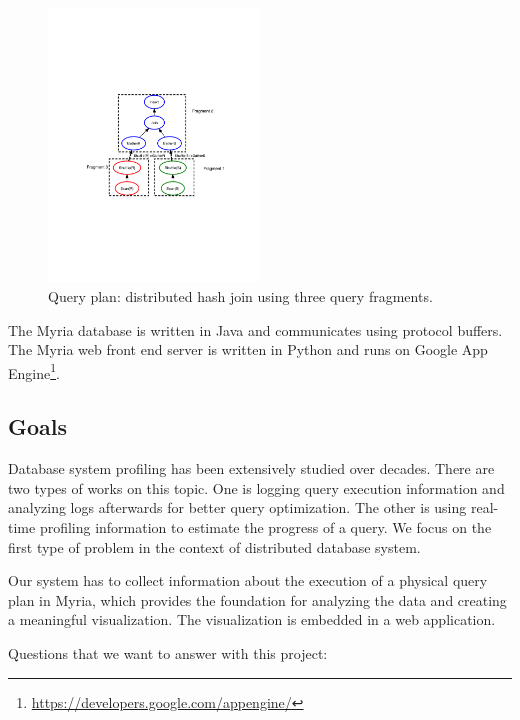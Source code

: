 \documentclass[11pt]{scrartcl}
\begin{document}
\begin{figure}
 \begin{center}
     \includegraphics[width=0.5\textwidth]{join.pdf}
   \end{center}
  \caption{Query plan: distributed hash join using three query fragments.}
  \label{fig:query_plan}
\end{figure}

The Myria database is written in Java and communicates using protocol buffers. The Myria web front end server is written in Python and runs on Google App Engine\footnote{\url{https://developers.google.com/appengine/}}.


\subsection{Goals}
\label{sec:objective}

Database system profiling has been extensively studied over decades. There are two types of works on this topic. One is logging query execution information and analyzing logs afterwards for better query optimization. The other is using real-time profiling information to estimate the progress of a query. We focus on the first type of problem in the context of distributed database system.

Our system has to collect information about the execution of a physical query plan in Myria, which provides the foundation for analyzing the data and creating a meaningful visualization. The visualization is embedded in a web application.

\vspace{5px}

\noindent Questions that we want to answer with this project:
\end{document}
